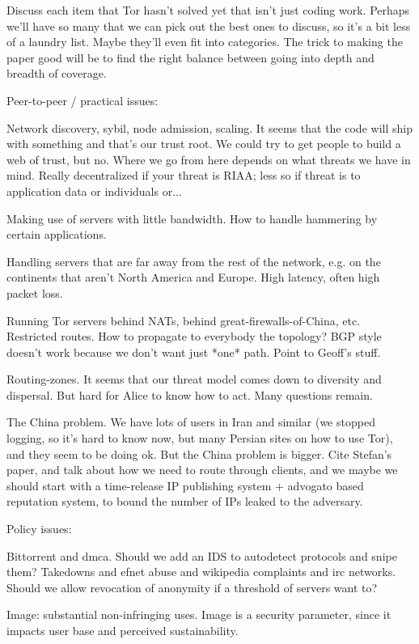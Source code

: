 Discuss each item that Tor hasn't solved yet that isn't just coding
work.  Perhaps we'll have so many that we can pick out the best ones to
discuss, so it's a bit less of a laundry list. Maybe they'll even fit
into categories. The trick to making the paper good will be to find
the right balance between going into depth and breadth of coverage.


Peer-to-peer / practical issues:

Network discovery, sybil, node admission, scaling. It seems that the code
will ship with something and that's our trust root. We could try to get
people to build a web of trust, but no. Where we go from here depends
on what threats we have in mind. Really decentralized if your threat is
RIAA; less so if threat is to application data or individuals or...

Making use of servers with little bandwidth. How to handle hammering by
certain applications.

Handling servers that are far away from the rest of the network, e.g. on
the continents that aren't North America and Europe. High latency,
often high packet loss.

Running Tor servers behind NATs, behind great-firewalls-of-China, etc.
Restricted routes. How to propagate to everybody the topology? BGP
style doesn't work because we don't want just *one* path. Point to
Geoff's stuff.

Routing-zones. It seems that our threat model comes down to diversity and
dispersal. But hard for Alice to know how to act. Many questions remain.

The China problem. We have lots of users in Iran and similar (we stopped
logging, so it's hard to know now, but many Persian sites on how to use
Tor), and they seem to be doing ok. But the China problem is bigger. Cite
Stefan's paper, and talk about how we need to route through clients,
and we maybe we should start with a time-release IP publishing system +
advogato based reputation system, to bound the number of IPs leaked to the
adversary.


Policy issues:

Bittorrent and dmca. Should we add an IDS to autodetect protocols and
snipe them? Takedowns and efnet abuse and wikipedia complaints and irc
networks. Should we allow revocation of anonymity if a threshold of
servers want to?

Image: substantial non-infringing uses. Image is a security parameter,
since it impacts user base and perceived sustainability.

